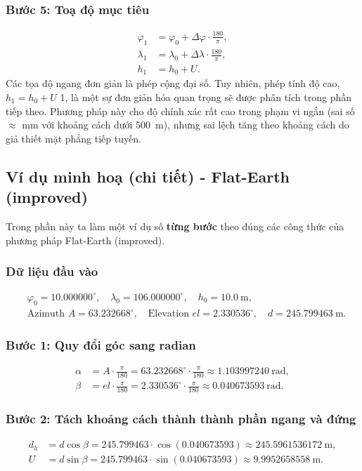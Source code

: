 \subsubsection{Bước 5: Toạ độ mục tiêu}
\[
\begin{aligned}
    \varphi_1 &= \varphi_0 + \Delta\varphi \cdot \frac{180}{\pi},\\
    \lambda_1 &= \lambda_0 + \Delta\lambda \cdot \frac{180}{\pi},\\
    h_1 &= h_0 + U.
\end{aligned}
\]
Các tọa độ ngang đơn giản là phép cộng đại số. Tuy nhiên, phép tính độ cao, $h_1 = h_0 + U$ 1, là một sự đơn giản hóa quan trọng sẽ được phân tích trong phần tiếp theo. Phương pháp này cho độ chính xác rất cao trong phạm vi ngắn (sai số $\approx$ mm với khoảng cách dưới 500~m), nhưng sai lệch tăng theo khoảng cách do giả thiết mặt phẳng tiếp tuyến.
\subsection{Ví dụ minh hoạ (chi tiết) - Flat-Earth (improved)}
Trong phần này ta làm một ví dụ số \textbf{từng bước} theo đúng các công thức của phương pháp Flat-Earth (improved).

\subsubsection*{Dữ liệu đầu vào}
\[
\begin{aligned}
&\varphi_0 = 10.000000^\circ,\quad \lambda_0 = 106.000000^\circ,\quad h_0 = 10.0\ \mathrm{m},\\
&\text{Azimuth } A = 63.232668^\circ,\quad \text{Elevation } el = 2.330536^\circ,\quad d = 245.799463\ \mathrm{m}.
\end{aligned}
\]

\subsubsection*{Bước 1: Quy đổi góc sang radian}
\[
\begin{aligned}
\alpha &= A\cdot\frac{\pi}{180} = 63.232668^\circ\cdot\frac{\pi}{180} \approx 1.103997240\ \text{rad},\\[4pt]
\beta &= el\cdot\frac{\pi}{180} = 2.330536^\circ\cdot\frac{\pi}{180} \approx 0.040673593\ \text{rad}.
\end{aligned}
\]

\subsubsection*{Bước 2: Tách khoảng cách thành thành phần ngang và đứng}
\[
\begin{aligned}
d_h &= d\cos\beta = 245.799463\cdot\cos(0.040673593) \approx 245.5961536172\ \mathrm{m},\\[4pt]
U   &= d\sin\beta = 245.799463\cdot\sin(0.040673593) \approx 9.9952658558\ \mathrm{m}.
\end{aligned}
\]

